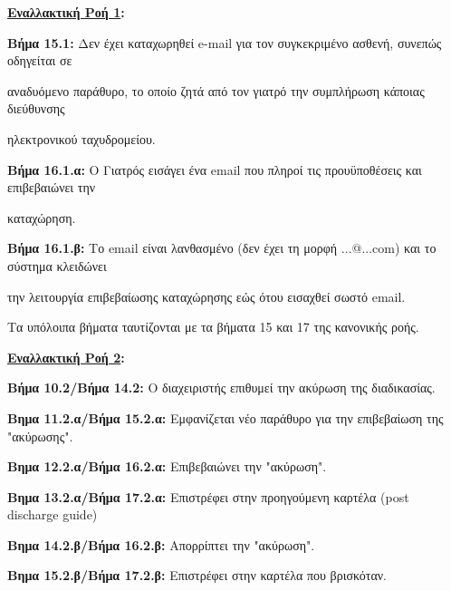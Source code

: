 \documentclass{article}
\begin{document}
 \textbf{\underline{Εναλλακτική Ροή 1}:} \vspace{0.2cm}
\par \textbf{Βήμα 15.1:} Δεν έχει καταχωρηθεί e-mail για τον συγκεκριμένο ασθενή, συνεπώς οδηγείται σε \par αναδυόμενο παράθυρο, το οποίο ζητά από τον γιατρό την συμπλήρωση κάποιας διεύθυνσης \par ηλεκτρονικού ταχυδρομείου.

\vspace{0.2cm}

\par \textbf{Βήμα 16.1.α:} Ο Γιατρός εισάγει ένα email που πληροί τις προυϋποθέσεις και επιβεβαιώνει την \par καταχώρηση. \vspace{0.2cm}
\par \textbf{Βήμα 16.1.β:} Το email είναι λανθασμένο (δεν έχει τη μορφή ...@...com) και το σύστημα κλειδώνει \par την λειτουργία επιβεβαίωσης καταχώρησης εώς ότου εισαχθεί σωστό email. \vspace{0.1cm}

\par Τα υπόλοιπα βήματα ταυτίζονται με τα βήματα 15 και 17 της κανονικής ροής.

\vspace{0.2cm}

\textbf{\underline{Εναλλακτική Ροή 2}:} \vspace{0.2cm}
\par \textbf{Βήμα 10.2/Βήμα 14.2:} Ο διαχειριστής επιθυμεί την ακύρωση της διαδικασίας.

\vspace{0.3cm}

\par \textbf{Βημα 11.2.α/Βήμα 15.2.α:} Εμφανίζεται νέο παράθυρο για την επιβεβαίωση της "ακύρωσης". \vspace{0.1cm}
\par \textbf{Βημα 12.2.α/Βήμα 16.2.α:} Επιβεβαιώνει την "ακύρωση". \vspace{0.1cm}
\par \textbf{Βημα 13.2.α/Βήμα 17.2.α:} Επιστρέφει στην προηγούμενη καρτέλα (post discharge guide) \vspace{0.3cm}

\par \textbf{Βημα 14.2.β/Βήμα 16.2.β:}  Απορρίπτει την "ακύρωση". \vspace{0.1cm}
\par \textbf{Βημα 15.2.β/Βήμα 17.2.β:} Επιστρέφει στην καρτέλα που βρισκόταν.
\end{document}
